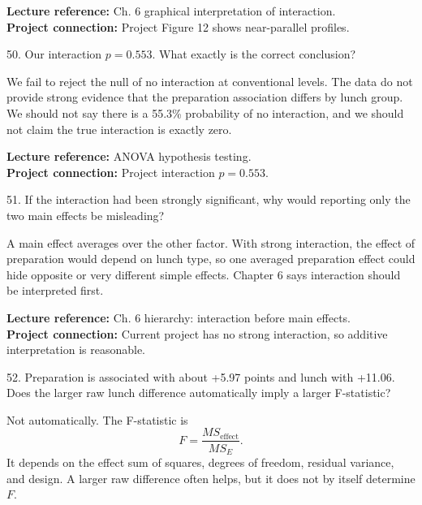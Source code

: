 \documentclass[10.5pt,a4paper]{article}
\newcommand{\chapref}[1]{\textbf{Lecture reference:} #1}
\newcommand{\projectref}[1]{\textbf{Project connection:} #1}
\begin{document}
\begin{refbox}\chapref{Ch. 6 graphical interpretation of interaction.}\\\projectref{Project Figure 12 shows near-parallel profiles.}\end{refbox}
\begin{qbox}{50. Our interaction $p=0.553$. What exactly is the correct conclusion?}
\end{qbox}
\begin{answerbox}We fail to reject the null of no interaction at conventional levels. The data do not provide strong evidence that the preparation association differs by lunch group. We should not say there is a 55.3\% probability of no interaction, and we should not claim the true interaction is exactly zero.\end{answerbox}
\begin{refbox}\chapref{ANOVA hypothesis testing.}\\\projectref{Project interaction $p=0.553$.}\end{refbox}
\begin{qbox}{51. If the interaction had been strongly significant, why would reporting only the two main effects be misleading?}
\end{qbox}
\begin{answerbox}A main effect averages over the other factor. With strong interaction, the effect of preparation would depend on lunch type, so one averaged preparation effect could hide opposite or very different simple effects. Chapter 6 says interaction should be interpreted first.\end{answerbox}
\begin{refbox}\chapref{Ch. 6 hierarchy: interaction before main effects.}\\\projectref{Current project has no strong interaction, so additive interpretation is reasonable.}\end{refbox}
\begin{qbox}{52. Preparation is associated with about +5.97 points and lunch with +11.06. Does the larger raw lunch difference automatically imply a larger F-statistic?}
\end{qbox}
\begin{answerbox}Not automatically. The F-statistic is
\[
F=\frac{MS_{\text{effect}}}{MS_E}.
\]
It depends on the effect sum of squares, degrees of freedom, residual variance, and design. A larger raw difference often helps, but it does not by itself determine \(F\).\end{answerbox}
\end{document}
